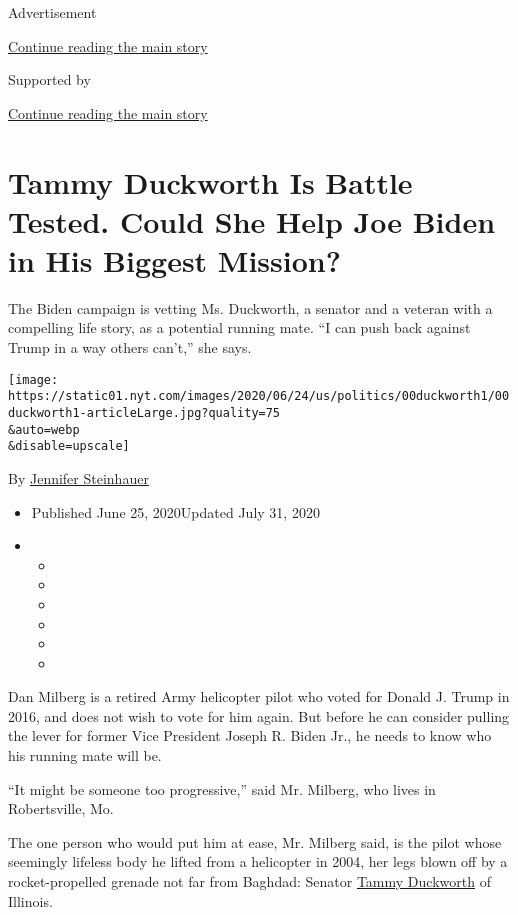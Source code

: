 Advertisement

\protect\hyperlink{after-top}{Continue reading the main story}

Supported by

\protect\hyperlink{after-sponsor}{Continue reading the main story}

\hypertarget{tammy-duckworth-is-battle-tested-could-she-help-joe-biden-in-his-biggest-mission}{%
\section{Tammy Duckworth Is Battle Tested. Could She Help Joe Biden in
His Biggest
Mission?}\label{tammy-duckworth-is-battle-tested-could-she-help-joe-biden-in-his-biggest-mission}}

The Biden campaign is vetting Ms. Duckworth, a senator and a veteran
with a compelling life story, as a potential running mate. ``I can push
back against Trump in a way others can't,'' she says.

\texttt{[image: https://static01.nyt.com/images/2020/06/24/us/politics/00duckworth1/00duckworth1-articleLarge.jpg?quality=75\\\&auto=webp\\\&disable=upscale]}

By \href{https://www.nytimes.com/by/jennifer-steinhauer}{Jennifer
Steinhauer}

\begin{itemize}
\item
  Published June 25, 2020Updated July 31, 2020
\item
  \begin{itemize}
  \item
  \item
  \item
  \item
  \item
  \item
  \end{itemize}
\end{itemize}

Dan Milberg is a retired Army helicopter pilot who voted for Donald J.
Trump in 2016, and does not wish to vote for him again. But before he
can consider pulling the lever for former Vice President Joseph R. Biden
Jr., he needs to know who his running mate will be.

``It might be someone too progressive,'' said Mr. Milberg, who lives in
Robertsville, Mo.

The one person who would put him at ease, Mr. Milberg said, is the pilot
whose seemingly lifeless body he lifted from a helicopter in 2004, her
legs blown off by a rocket-­propelled grenade not far from Baghdad:
Senator
\href{https://www.nytimes.com/2020/07/08/us/politics/tucker-carlson-tammy-duckworth.html}{Tammy
Duckworth} of Illinois.

